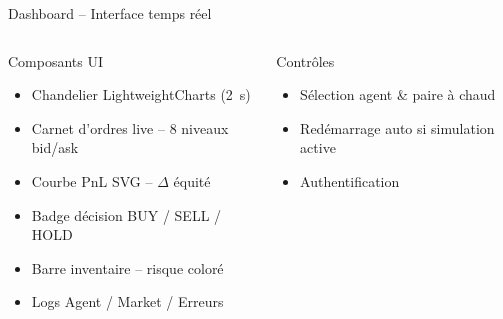 \documentclass[11pt,aspectratio=169]{beamer}
\begin{document}
\begin{frame}{Dashboard -- Interface temps réel}
    \begin{columns}[T]
        \footnotesize
        \begin{block}{Composants UI}
            \begin{itemize}
                \item \alert{Chandelier} LightweightCharts (2~s)
                \item \alert{Carnet d'ordres} live -- 8 niveaux bid/ask
                \item \alert{Courbe PnL} SVG -- $\Delta$ équité
                \item \alert{Badge décision} BUY / SELL / HOLD
                \item \alert{Barre inventaire} -- risque coloré
                \item \alert{Logs} Agent / Market / Erreurs
            \end{itemize}
        \end{block}
        \vspace{0.2cm}
        \begin{block}{Contrôles}
            \begin{itemize}
                \item Sélection \alert{agent} \& \alert{paire} à chaud
                \item Redémarrage auto si simulation active
                \item \alert{Authentification}
            \end{itemize}
        \end{block}
    \end{columns}
\end{frame}
\end{document}
